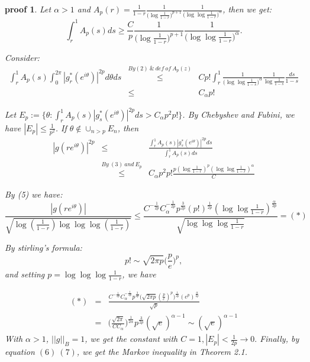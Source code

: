 \documentclass{article}
\theoremstyle{plain}
\newtheorem*{prf}{proof}
\theoremstyle{definition}
\theoremstyle{remark}
\begin{document}
\begin{prf}
Let $\alpha>1$ and $A_p(r)=\frac{1}{1-r}\frac{1}{\big(\log\frac{1}{1-r}\big)^{p+1}}\frac{1}{\big(\log\log\frac{1}{1-r}\big)^{\alpha}}$, then we get:
\begin{equation}
    \int^{1}_{r}A_p(s)ds\geq\frac{C}{p}\frac{1}{\big(\log\frac{1}{1-r}\big)^{p+1}}\frac{1}{\big(\log\log\frac{1}{1-r}\big)^{\alpha}}.
\end{equation}

Consider:
\begin{equation}
    \begin{array}{lcl}
         \int^{1}_rA_p(s)
         \int^{2\pi}_{0}|g_r^*(e^{i\theta})|^{2p}d\theta
         ds
         &\overset{By(2)\ \&\ def\ of\ A_p(z)}{\leq}&
         Cp!\int^1_r\frac{1}{\big(\log\log\frac{1}{1-s}\big)^{\alpha}}\frac{1}{\log\frac{1}{1-s}}\frac{ds}{1-s}\\
         &\leq&C_{\alpha}p! 
    \end{array}
\end{equation}

Let $E_p:=\{\theta:\int^1_rA_p(s)|g_s^*(e^{i\theta})|^{2p}ds>C_{\alpha}p^2p!\}$. By Chebyshev and Fubini, we have $|E_p|\leq \frac{1}{p^2}$. If $\theta\notin \cup_{n>p}E_n$, then
\begin{equation}
    \begin{array}{lcl}
        |g(re^{i\theta})|^{2p} &\leq&\frac{\int^1_rA_p(s)|g^*_s(e^{i\theta})|^{2p}ds}{\int^1_rA_p(s)ds}  \\
         &\overset{By\ (3)\ and\ E_p}{\leq}&C_{\alpha}p^2p!\frac{p(\log\frac{1}{1-r})^p(\log\log\frac{1}{1-r})^{\alpha}}{C} 
    \end{array}
\end{equation}

By (5) we have:
\begin{equation}
    \frac{|g(re^{i\theta})|}{\sqrt{\log(\frac{1}{1-r})\log\log\log(\frac{1}{1-r})}}
    \leq
    \frac{C^{-\frac{1}{2p}}C_{\alpha}^{-\frac{1}{2p}}p^{\frac{3}{2p}}(p!)^{\frac{1}{2p}}(\log\log\frac{1}{1-r})^{\frac{\alpha}{2p}}}{\sqrt{\log\log\log\frac{1}{1-r}}}=(*)
\end{equation}

By stirling's formula:
$$p!\sim \sqrt{2\pi p}\big(\frac{p}{e}\big)^p,$$
and setting $p=\log\log\log\frac{1}{1-r}$, we have

\begin{equation}
\begin{array}{lcl}
    (*) & =& \frac{
          C^{-\frac{1}{2p}}
          C_{\alpha}^{-\frac{1}{2p}}
          p^{\frac{3}{2p}}
        \big(
          \sqrt{2\pi p}
          (\frac{p}{e})^p
        \big)^{\frac{1}{2p}}
          (e^p)^{\frac{\alpha}{2p}}
          }
          {\sqrt{p}} \\
     &=& \big(\frac{\sqrt{2\pi}}{CC_{\alpha}}\big)^{\frac{1}{2\alpha}}
           p^{\frac{3}{2p}}(\sqrt{e})^{\alpha-1}\sim(\sqrt{e})^{\alpha-1}
\end{array}
           \end{equation}
With $\alpha>1$, $||g||_B=1$, we get the constant with $C=1,|E_p|<\frac{1}{2p}\to 0.$ Finally, by equation $(6)\ (7)$, we get the Markov inequality in Theorem 2.1.

\end{prf}
\end{document}
